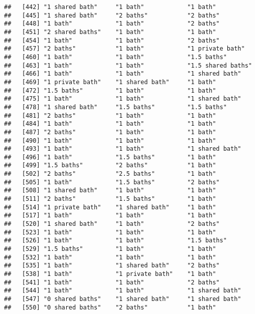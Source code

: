 \documentclass[
]{article}
\begin{document}
\begin{verbatim}
##   [442] "1 shared bath"     "1 bath"            "1 bath"           
##   [445] "1 shared bath"     "2 baths"           "2 baths"          
##   [448] "1 bath"            "1 bath"            "2 baths"          
##   [451] "2 shared baths"    "1 bath"            "1 bath"           
##   [454] "1 bath"            "1 bath"            "2 baths"          
##   [457] "2 baths"           "1 bath"            "1 private bath"   
##   [460] "1 bath"            "1 bath"            "1.5 baths"        
##   [463] "1 bath"            "1 bath"            "1.5 shared baths" 
##   [466] "1 bath"            "1 bath"            "1 shared bath"    
##   [469] "1 private bath"    "1 shared bath"     "1 bath"           
##   [472] "1.5 baths"         "1 bath"            "1 bath"           
##   [475] "1 bath"            "1 bath"            "1 shared bath"    
##   [478] "1 shared bath"     "1.5 baths"         "1.5 baths"        
##   [481] "2 baths"           "1 bath"            "1 bath"           
##   [484] "1 bath"            "1 bath"            "1 bath"           
##   [487] "2 baths"           "1 bath"            "1 bath"           
##   [490] "1 bath"            "1 bath"            "1 bath"           
##   [493] "1 bath"            "1 bath"            "1 shared bath"    
##   [496] "1 bath"            "1.5 baths"         "1 bath"           
##   [499] "1.5 baths"         "2 baths"           "1 bath"           
##   [502] "2 baths"           "2.5 baths"         "1 bath"           
##   [505] "1 bath"            "1.5 baths"         "2 baths"          
##   [508] "1 shared bath"     "1 bath"            "1 bath"           
##   [511] "2 baths"           "1.5 baths"         "1 bath"           
##   [514] "1 private bath"    "1 shared bath"     "1 bath"           
##   [517] "1 bath"            "1 bath"            "1 bath"           
##   [520] "1 shared bath"     "1 bath"            "2 baths"          
##   [523] "1 bath"            "1 bath"            "1 bath"           
##   [526] "1 bath"            "1 bath"            "1.5 baths"        
##   [529] "1.5 baths"         "1 bath"            "1 bath"           
##   [532] "1 bath"            "1 bath"            "1 bath"           
##   [535] "1 bath"            "1 shared bath"     "2 baths"          
##   [538] "1 bath"            "1 private bath"    "1 bath"           
##   [541] "1 bath"            "1 bath"            "2 baths"          
##   [544] "1 bath"            "1 bath"            "1 shared bath"    
##   [547] "0 shared baths"    "1 shared bath"     "1 shared bath"    
##   [550] "0 shared baths"    "2 baths"           "1 bath"           

\end{verbatim}
\end{document}
